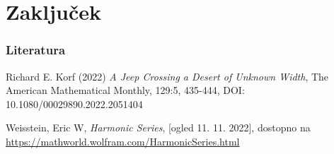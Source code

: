 \documentclass{beamer}
\begin{document}
\section{Zaključek} 
 \begin{frame}
    \frametitle{Literatura}
    \begin{thebibliography}{9}
        Richard E. Korf (2022) \textit{A Jeep Crossing a Desert of Unknown Width}, The
        American Mathematical Monthly, 129:5, 435-444, DOI: 10.1080/00029890.2022.2051404
                
        Weisstein, Eric W, \textit{Harmonic Series}, [ogled 11. 11. 2022], dostopno na \url{https://mathworld.wolfram.com/HarmonicSeries.html}
        \end{thebibliography}
   \end{frame}
\end{document}
